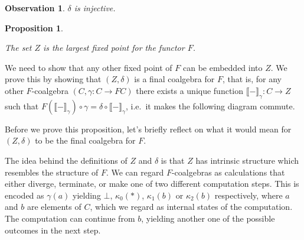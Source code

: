 \documentclass[a4paper]{article}
\newcommand{\arr}{\rightarrow}
\newcommand{\semantics}[1]{\llbracket #1 \rrbracket}
\newtheorem{obsNuFCoalgebraIsInjective}[defNuF]{Observation}
\newtheorem{thmDomNuFisFinal}[defNuF]{Proposition}
\begin{document}
\begin{obsNuFCoalgebraIsInjective}
$\delta$ is injective.
\end{obsNuFCoalgebraIsInjective}

\begin{thmDomNuFisFinal}
\label{thmDomNuFisFinal}

The set $Z$ is the largest fixed point for the functor $F$.

\end{thmDomNuFisFinal}

We need to show that any other fixed point of $F$ can be embedded into $Z$.  We
prove this by showing that $(Z, \delta)$ is a final coalgebra for $F$, that is,
for any other $F$-coalgebra $(C, \gamma : C \arr FC)$ there exists a unique
function $\semantics{-}_{\gamma} : C \arr Z$ such that
$F(\semantics{-}_{\gamma}) \circ \gamma = \delta \circ \semantics{-}_{\gamma}$,
i.e.~it makes the following diagram commute.

\begin{figure}[h]
\begin{center}
\end{center}
\end{figure}

Before we prove this proposition, let's briefly reflect on what it would mean
for $(Z, \delta)$ to be the final coalgebra for $F$.

The idea behind the definitions of $Z$ and $\delta$ is that $Z$ has intrinsic
structure which resembles the structure of $F$.  We can regard $F$-coalgebras as
calculations that either diverge, terminate, or make one of two different
computation steps.  This is encoded as $\gamma(a)$ yielding $\bot$, $\kappa_0(*)$,
$\kappa_1(b)$ or $\kappa_2(b)$ respectively, where $a$ and $b$ are elements of
$C$, which we regard as internal states of the computation. The computation can
continue from $b$, yielding another one of the possible outcomes in the next
step.
\end{document}
